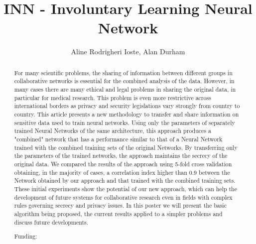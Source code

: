 \documentclass[twoside]{article}
\title{\vspace{-15mm}\fontsize{24pt}{10pt}\selectfont\textbf{ INN - Involuntary Learning Neural Network }} %
\author{ Aline Rodrigheri Ioste, Alan Durham }
\affil{ Universidade de S\~ao Paulo }
\date{}
\begin{document}
  
  
  \maketitle %
  
  
  \thispagestyle{fancy} %
  
  
  \begin{abstract}
  For many scientific problems,  the sharing of information between different groups in collaborative networks is essential for the combined analysis of the data.  However,  in many cases there are many ethical and legal problems in sharing the original data,  in particular for medical research. This problem is even more restrictive across international borders as privacy  and security legislations vary strongly from country to country. This article presents a new methodology to transfer and share information on sensitive data used to train neural networks. Using only the parameters of separately trained Neural Networks of the same architecture,  this approach produces a "combined" network that has a performance similar to that of a Neural Network trained with the combined training sets of the original Networks. By transferring only the parameters of the trained networks,  the approach maintains the secrecy of the original data. We compared the results of the approach using 5-fold cross validation obtaining,  in the majority of cases,  a correlation index higher than 0.9 between the Network obtained by our approach and that trained with the combined training sets. These initial experiments show the potential of our new approach,  which can help the development of future systems for collaborative research even in fields with complex rules governing secrecy and privacy issues. In this poster we will present the basic algorithm being proposed,  the current results applied to a simpler problems and discuss future developments.
  
  Funding:  \\ 
  \end{abstract}
  
\end{document}

